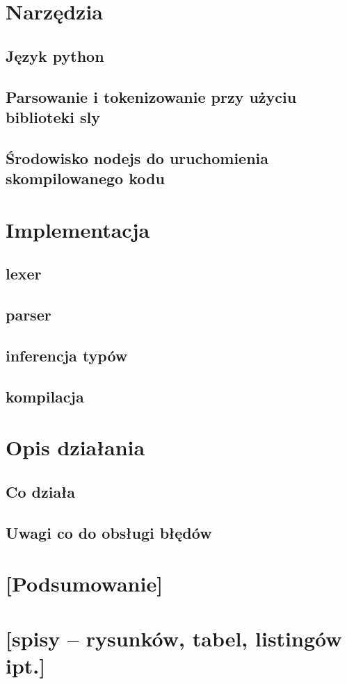 \documentclass{article}
\begin{document}
\section{Narzędzia}
\subsection{Język python}
\subsection{Parsowanie i tokenizowanie przy użyciu biblioteki sly}
\subsection{Środowisko nodejs do uruchomienia skompilowanego kodu}
\section{Implementacja}
\subsection{lexer}
\subsection{parser}
\subsection{inferencja typów}
\subsection{kompilacja}
\section{Opis działania}
\subsection{Co działa}
\subsection{Uwagi co do obsługi błędów}
\section{[Podsumowanie]}
\section{[spisy -- rysunków, tabel, listingów ipt.]}


\end{document}
